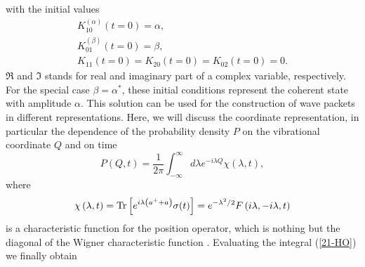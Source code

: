 \documentclass[12pt,twoside,a4paper]{report}
\begin{document}
with the initial values
\begin{equation}
\begin{array}{c}
  {K}
     _{10}
     ^{(\alpha )}
     (t=0)  
               = 
                    \alpha , \\ 
  {K}
     _{01}
     ^{(\beta )} 
     (t=0) 
               = 
                    \beta  , \\ 
  {K}_{11}
     \left( 
          t=0
     \right) 
               =
                    K_{20}
                        \left( 
                            t=0
                        \right) 
               =
                    K_{02}
                        \left(
                            t=0
                        \right) 
               =
                    0.
\end{array}
\label{20-HO}
\end{equation}
$\Re$ and $\Im$ stands for real and imaginary part of a complex variable, respectively.
For the special case $\beta =\alpha ^{*}$, these initial conditions
represent the coherent state with amplitude $\alpha $. This solution
can be used for the construction of wave packets in different
representations.  Here, we will discuss the coordinate representation,
in particular
the dependence of the probability density $P$ on the vibrational
coordinate $Q$ and on time
\begin{equation}
  P
  \left( 
    Q,t
  \right) 
          =
            \frac 1{2\pi }
            \int_{-\infty }^\infty d\lambda
                e^{-{{i}}\lambda Q}
                \chi 
                \left( 
                   \lambda ,t
                \right) , \label{21-HO}
\end{equation}
where
\begin{equation}
  \chi 
    \left( 
       \lambda 
       ,t
    \right) 
                 =   {\rm Tr}
                       \left[ 
                           e^{{{i}}\lambda 
                           \left(
                               a^{+}+a
                           \right) }\sigma (t)
                       \right] 
                 =   e^{-\lambda^2/2}
                     F
                     \left( 
                        {{i}}\lambda ,-{{i}}\lambda ,t
                     \right) \label{22-HO}
\end{equation}
is a characteristic function for the position operator,
which is nothing but the diagonal of the Wigner characteristic function \cite{yuen76}. 
Evaluating the integral (\ref{21-HO}) we finally obtain
\end{document}
